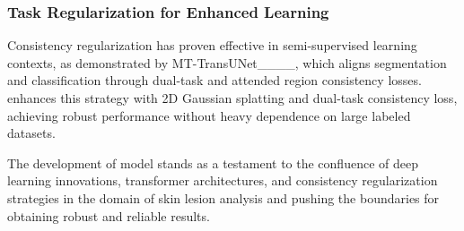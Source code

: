 \subsubsection{Task Regularization for Enhanced Learning}
Consistency regularization has proven effective in semi-supervised learning contexts, as demonstrated by MT-TransUNet____, which aligns segmentation and classification through dual-task and attended region consistency losses. \ours enhances this strategy with 2D Gaussian splatting and dual-task consistency loss, achieving robust performance without heavy dependence on large labeled datasets.

The development of \ours model stands as a testament to the confluence of deep learning innovations, transformer architectures, and consistency regularization strategies in the domain of skin lesion analysis and pushing the boundaries for obtaining robust and reliable results.

%